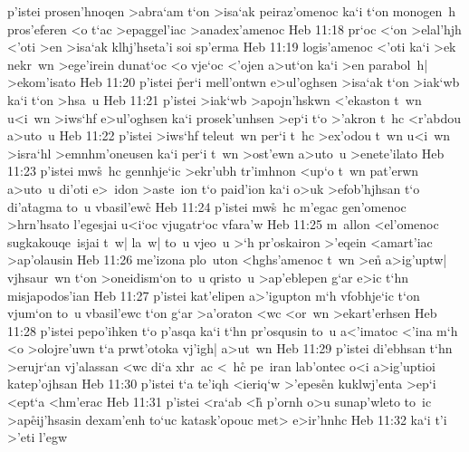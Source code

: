 p'istei
prosen'hnoqen
>abra`am
t`on
>isa`ak
peiraz'omenoc
ka`i
t`on
monogen~h
pros'eferen
<o
t`ac
>epaggel'iac
>anadex'amenoc\bibvsend
\vs Heb 11:18
pr`oc
<`on
>elal'hjh
<'oti
>en
>isa`ak
klhj'hseta'i
soi
sp'erma\bibvsend
\vs Heb 11:19
logis'amenoc
<'oti
ka`i
>ek
nekr~wn
>ege'irein
dunat`oc
<o
vje`oc
<'ojen
a>ut`on
ka`i
>en
parabol~h|
>ekom'isato\bibvsend
\vs Heb 11:20
p'istei
\r{p}er`i
mell'ontwn
e>ul'oghsen
>isa`ak
t`on
>iak`wb
ka`i
t`on
>hsa~u\bibvsend
\vs Heb 11:21
p'istei
>iak`wb
>apojn'hskwn
<'ekaston
t~wn
u<i~wn
>iws`hf
e>ul'oghsen
ka`i
prosek'unhsen
>ep`i
t`o
>'akron
t~hc
<r'abdou
a>uto~u\bibvsend
\vs Heb 11:22
p'istei
>iws`hf
teleut~wn
per`i
t~hc
>ex'odou
t~wn
u<i~wn
>isra`hl
>emnhm'oneusen
ka`i
per`i
t~wn
>ost'ewn
a>uto~u
>enete'ilato\bibvsend
\vs Heb 11:23
p'istei
mw\r{s}~hc
gennhje`ic
>ekr'ubh
tr'imhnon
<up`o
t~wn
pat'erwn
a>uto~u
di'oti
e>~idon
>aste~ion
t`o
paid'ion
ka`i
o>uk
>efob'hjhsan
t`o
di'a\r{t}agma
to~u
vbasil'ew\r{c}\bibvsend
{}
\vs Heb 11:24
p'istei
mw\r{s}~hc
m'egac
gen'omenoc
>hrn'hsato
l'egesjai
u<i`oc
vjugatr`oc
vfara'w\bibvsend
\vs Heb 11:25
m~allon
<el'omenoc
sugkakouqe~isjai
t~w|
la~w|
to~u
vjeo~u
>`h
pr'oskairon
>'eqein
<amart'iac
>ap'olausin\bibvsend
\vs Heb 11:26
me'izona
plo~uton
<hghs'amenoc
t~wn
>en\r{}
a>ig'uptw|
vjhsaur~wn
t`on
>oneidism`on
to~u
qristo~u
>ap'eblepen
g`ar
e>ic
t`hn
misjapodos'ian\bibvsend
\vs Heb 11:27
p'istei
kat'elipen
a>'igupton
m`h
vfobhje`ic
t`on
vjum`on
to~u
vbasil'ewc
t`on
g`ar
>a'oraton
<wc
<or~wn
>ekart'erhsen\bibvsend
\vs Heb 11:28
p'istei
pepo'ihken
t`o
p'asqa
ka`i
t`hn
pr'osqusin
to~u
a<'imatoc
<'ina
m`h
<o
>olojre'uwn
t`a
prwt'otoka
vj'igh|
a>ut~wn\bibvsend
\vs Heb 11:29
p'istei
di'ebhsan
t`hn
>erujr`an
vj'alassan
<wc
di`a
xhr~ac
<~h\r{c}
pe~iran
lab'ontec
o<i
a>ig'uptioi
katep'ojhsan\bibvsend
\vs Heb 11:30
p'istei
t`a
te'iqh
<ieriq`w
>'epes\r{e}n
kuklwj'enta
>ep`i
<ept`a
<hm'erac\bibvsend
\vs Heb 11:31
p'istei
<ra`ab
<h\r{}
p'ornh
o>u
sunap'wleto
to~ic
>ap\r{e}ij'hsasin
dexam'enh
to`uc
katask'opouc
met>
e>ir'hnhc\bibvsend
\vs Heb 11:32
ka`i
t'i
>'eti
l'egw
